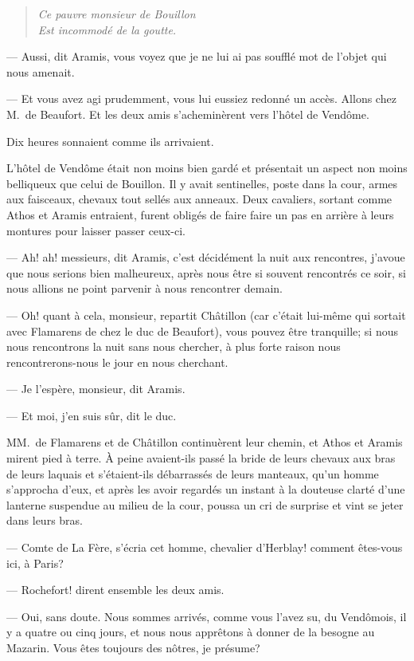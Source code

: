 \begin{verse}\itshape
Ce pauvre monsieur de Bouillon\\
Est incommodé de la goutte.\\
\end{verse}

— Aussi, dit Aramis, vous voyez que je ne lui ai pas soufflé mot de l'objet qui nous amenait.

— Et vous avez agi prudemment, vous lui eussiez redonné un accès. Allons chez M.~de Beaufort.
Et les deux amis s'acheminèrent vers l'hôtel de Vendôme.

Dix heures sonnaient comme ils arrivaient.

L'hôtel de Vendôme était non moins bien gardé et présentait un aspect non moins belliqueux que celui de Bouillon. Il y avait sentinelles, poste dans la cour, armes aux faisceaux, chevaux tout sellés aux anneaux. Deux cavaliers, sortant comme Athos et Aramis entraient, furent obligés de faire faire un pas en arrière à leurs montures pour laisser passer ceux-ci.

— Ah! ah! messieurs, dit Aramis, c'est décidément la nuit aux rencontres, j'avoue que nous serions bien malheureux, après nous être si souvent rencontrés ce soir, si nous allions ne point parvenir à nous rencontrer demain.

— Oh! quant à cela, monsieur, repartit Châtillon (car c'était lui-même qui sortait avec Flamarens de chez le duc de Beaufort), vous pouvez être tranquille; si nous nous rencontrons la nuit sans nous chercher, à plus forte raison nous rencontrerons-nous le jour en nous cherchant.

— Je l'espère, monsieur, dit Aramis.

— Et moi, j'en suis sûr, dit le duc.

MM.~de Flamarens et de Châtillon continuèrent leur chemin, et Athos et Aramis mirent pied à terre.
À peine avaient-ils passé la bride de leurs chevaux aux bras de leurs laquais et s'étaient-ils débarrassés de leurs manteaux, qu'un homme s'approcha d'eux, et après les avoir regardés un instant à la douteuse clarté d'une lanterne suspendue au milieu de la cour, poussa un cri de surprise et vint se jeter dans leurs bras.

— Comte de La Fère, s'écria cet homme, chevalier d'Herblay! comment êtes-vous ici, à Paris?

— Rochefort! dirent ensemble les deux amis.

— Oui, sans doute. Nous sommes arrivés, comme vous l'avez su, du Vendômois, il y a quatre ou cinq jours, et nous nous apprêtons à donner de la besogne au Mazarin. Vous êtes toujours des nôtres, je présume?

